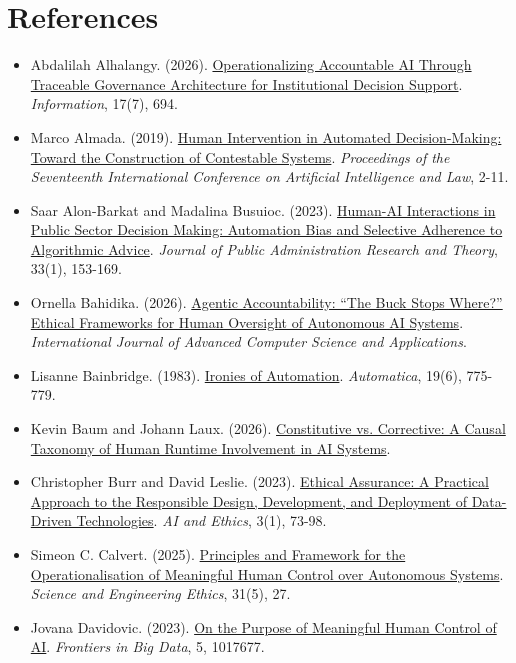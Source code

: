 \documentclass[11pt]{article}
\begin{document}
\section*{References}
\begin{itemize}[leftmargin=*]
\item Abdalilah Alhalangy. (2026). \href{https://doi.org/10.3390/info17070694}{Operationalizing Accountable AI Through Traceable Governance Architecture for Institutional Decision Support}. \emph{Information}, 17(7), 694.
\item Marco Almada. (2019). \href{https://doi.org/10.1145/3322640.3326699}{Human Intervention in Automated Decision-Making: Toward the Construction of Contestable Systems}. \emph{Proceedings of the Seventeenth International Conference on Artificial Intelligence and Law}, 2-11.
\item Saar Alon-Barkat and Madalina Busuioc. (2023). \href{https://doi.org/10.1093/jopart/muac007}{Human-AI Interactions in Public Sector Decision Making: Automation Bias and Selective Adherence to Algorithmic Advice}. \emph{Journal of Public Administration Research and Theory}, 33(1), 153-169.
\item Ornella Bahidika. (2026). \href{https://doi.org/10.14569/IJACSA.2026.0170502}{Agentic Accountability: ``The Buck Stops Where?'' Ethical Frameworks for Human Oversight of Autonomous AI Systems}. \emph{International Journal of Advanced Computer Science and Applications}.
\item Lisanne Bainbridge. (1983). \href{https://doi.org/10.1016/0005-1098(83)90046-8}{Ironies of Automation}. \emph{Automatica}, 19(6), 775-779.
\item Kevin Baum and Johann Laux. (2026). \href{https://doi.org/10.48550/arXiv.2603.19213}{Constitutive vs. Corrective: A Causal Taxonomy of Human Runtime Involvement in AI Systems}.
\item Christopher Burr and David Leslie. (2023). \href{https://doi.org/10.1007/s43681-022-00178-0}{Ethical Assurance: A Practical Approach to the Responsible Design, Development, and Deployment of Data-Driven Technologies}. \emph{AI and Ethics}, 3(1), 73-98.
\item Simeon C. Calvert. (2025). \href{https://doi.org/10.1007/s11948-025-00554-z}{Principles and Framework for the Operationalisation of Meaningful Human Control over Autonomous Systems}. \emph{Science and Engineering Ethics}, 31(5), 27.
\item Jovana Davidovic. (2023). \href{https://doi.org/10.3389/fdata.2022.1017677}{On the Purpose of Meaningful Human Control of AI}. \emph{Frontiers in Big Data}, 5, 1017677.

\end{itemize}
\end{document}
